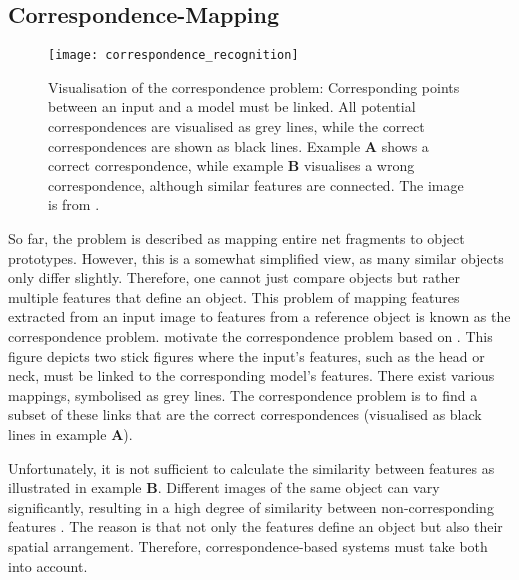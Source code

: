 \subsection{Correspondence-Mapping}
\begin{figure}[h]
    \centering
    \texttt{[image: correspondence\_recognition]}
    \caption[The visual correspondence problem]{Visualisation of the correspondence problem: Corresponding points between an input and a model must be linked. All potential correspondences are visualised as grey lines, while the correct correspondences are shown as black lines. Example $\boldsymbol{A}$ shows a correct correspondence, while example $\boldsymbol{B}$ visualises a wrong correspondence, although similar features are connected. The image is from \cite{wolfrum_recurrent_2008}.}
\end{figure}

So far, the problem is described as mapping entire net fragments to object prototypes.
However, this is a somewhat simplified view, as many similar objects only differ slightly.
Therefore, one cannot just compare objects but rather multiple features that define an object.
This problem of mapping features extracted from an input image to features from a reference object is known as the correspondence problem.
 motivate the correspondence problem based on . This figure depicts two stick figures where the input's features, such as the head or neck, must be linked to the corresponding model's features.
There exist various mappings, symbolised as grey lines.
The correspondence problem is to find a subset of these links that are the correct correspondences (visualised as black lines in example $\boldsymbol{A}$). 

Unfortunately, it is not sufficient to calculate the similarity between features as illustrated in 
 example $\boldsymbol{B}$. Different images of the same object can vary significantly, resulting in a high degree of similarity between non-corresponding features . The reason is that not only the features define an object but also their spatial arrangement. Therefore, correspondence-based systems must take both into account.

